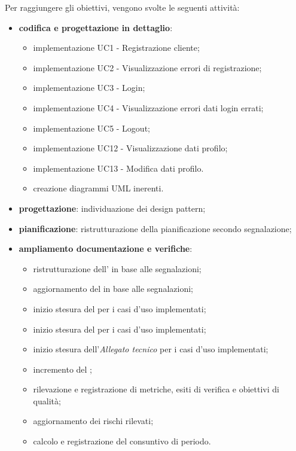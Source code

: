 Per raggiungere gli obiettivi, vengono svolte le seguenti attività:
\begin{itemize}

\item \textbf{codifica e progettazione in dettaglio}:
\begin{itemize}
\item implementazione UC1 - Registrazione cliente;
\item implementazione UC2 - Visualizzazione errori di registrazione;
\item implementazione UC3 - Login;
\item implementazione UC4 - Visualizzazione errori dati login errati;
\item implementazione UC5 - Logout;
\item implementazione UC12 - Visualizzazione dati profilo;
\item implementazione UC13 - Modifica dati profilo.
\item creazione diagrammi UML inerenti.

\end{itemize}

\item \textbf{progettazione}: individuazione dei design pattern;

\item \textbf{pianificazione}: ristrutturazione della pianificazione secondo segnalazione;

\item \textbf{ampliamento documentazione e verifiche}:
\begin{itemize}
\item ristrutturazione dell' in base alle segnalazioni;
\item aggiornamento del  in base alle segnalazioni;
\item inizio stesura del \MU{} per i casi d'uso implementati;
\item inizio stesura del \MM{} per i casi d'uso implementati;
\item inizio stesura dell'\textit{Allegato tecnico} per i casi d'uso implementati;
\item incremento del ;
\item rilevazione e registrazione di metriche, esiti di verifica e obiettivi di qualità;
\item aggiornamento dei rischi rilevati;
\item calcolo e registrazione del consuntivo di periodo.
\end{itemize}

\end{itemize}

